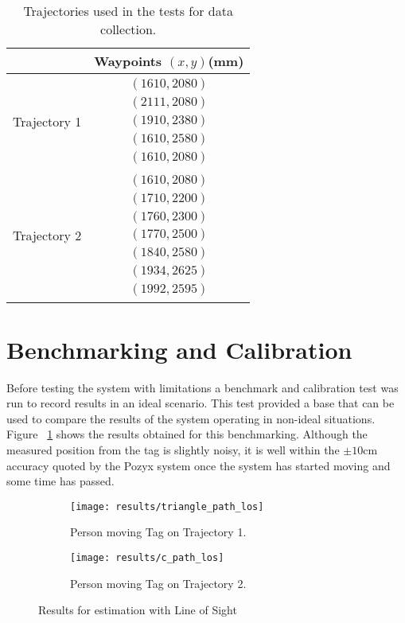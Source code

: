 \begin{table}[ht!]
    \centering
    \begin{tabular}{|c|c|}
        \hline
        & Waypoints $(x,y)$(mm)\\
        \hline
        Trajectory 1 & $\begin{array}{c}
                            (1610, 2080)\\
                            (2111, 2080)\\
                            (1910, 2380)\\
                            (1610, 2580)\\
                            (1610, 2080)
        \end{array}$\\
        \hline
        Trajectory 2 & $\begin{array}{c}
                            (1610, 2080)\\
                            (1710, 2200)\\
                            (1760, 2300)\\
                            (1770, 2500)\\
                            (1840, 2580)\\
                            (1934, 2625)\\
                            (1992, 2595)
        \end{array}$\\
        \hline
    \end{tabular}
    \caption{Trajectories used in the tests for data collection.}
    \label{tb:trajs}
\end{table}
\newpage
\section{Benchmarking and Calibration}\label{sec:benchmarking}
Before testing the system with limitations a benchmark and calibration test was run to record results in an ideal scenario.
This test provided a base that can be used to compare the results of the system operating in non-ideal situations.
Figure ~\ref{fig:los} shows the results obtained for this benchmarking.
Although the measured position from the tag is slightly noisy, it is well within the $\pm10$cm accuracy quoted by the Pozyx system once the system has started moving and some time has passed.
\begin{figure}[h!]
    \centering
    \begin{subfigure}{0.49\textwidth}
            \texttt{[image: results/triangle\_path\_los]}
            \caption{Person moving Tag on Trajectory 1.}
    \end{subfigure}
    \begin{subfigure}{0.49\textwidth}
            \texttt{[image: results/c\_path\_los]}
            \caption{Person moving Tag on Trajectory 2.}
    \end{subfigure}
    \caption{Results for estimation with Line of Sight}
    \label{fig:los}
\end{figure}

